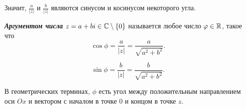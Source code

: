 Значит, $\frac{a}{|z|}$ и $\frac{b}{|z|}$ являются синусом и косинусом некоторого угла.

\begin{definition}
    \textbf{\textit{Аргументом числа}} $z = a + bi \in \mathbb{C} \setminus \{0\}$ называется любое число $\varphi \in \mathbb{R}$, такое что
    \begin{equation*}
        \cos \phi = \frac{a}{|z|} = \frac{a} {\sqrt{a^2 + b^2}}.
    \end{equation*}

    \begin{equation*}
        \sin \phi = \frac{b}{|z|} = \frac{b}{\sqrt{a^2 + b^2}}.
    \end{equation*}

    В геометрических терминах, $\phi$ есть угол между положительным направлением оси $Ox$ и вектором с началом в точке $0$ и концом в точке $z$.
\end{definition}

